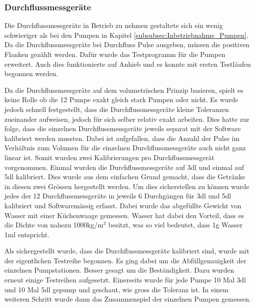\subsubsection{Durchflussmessgeräte}
\label{subsubsec:Inbetriebnahme_Durchflussmessgeräte}

Die Durchflussmessgeräte in Betrieb zu nehmen gestaltete sich ein wenig schwieriger als bei den Pumpen in Kapitel \ref{subsubsec:Inbetriebnahme_Pumpen}. Da die Durchflussmessgeräte bei Durchfluss Pulse ausgeben, müssen die positiven Flanken gezählt werden. Dafür wurde das Testprogramm für die Pumpen erweitert. Auch dies funktionierte auf Anhieb und es konnte mit ersten Testläufen begonnen werden. 

Da die Durchflussmessgeräte auf dem volumetrischen Prinzip basieren, spielt es keine Rolle ob die 12 Pumpe exakt gleich stark Pumpen oder nicht. Es wurde jedoch schnell festgestellt, dass die Durchflussmessgeräte kleine Toleranzen zueinander aufweisen, jedoch für sich selber relativ exakt arbeiten. Dies hatte zur folge, dass die einzelnen Durchflussmessgeräte jeweils separat mit der Software kalibriert werden mussten. Dabei ist aufgefallen, dass die Anzahl der Pulse im Verhältnis zum Volumen für die einzelnen Durchflussmessgeräte auch nicht ganz linear ist. Somit wurden zwei Kalibrierungen pro Durchflussmessgerät vorgenommen. Einmal wurden die Durchflussmessgeräte auf 3dl und einmal auf 5dl kalibriert. Dies wurde aus dem einfachen Grund gemacht, dass die Getränke in diesen zwei Grössen hergestellt werden. Um dies sicherstellen zu können wurde jedes der 12 Durchflussmessgeräte in jeweils 6 Durchgängen für 3dl und 5dl kalibriert und Softwaremässig erfasst. Dabei wurde das abgefüllte Gewicht von Wasser mit einer Küchenwaage gemessen. Wasser hat dabei den Vorteil, dass es die Dichte von nahezu 1000kg/m$^3$ besitzt, was so viel bedeutet, dass 1g Wasser 1ml entspricht. \cite{wagner_iapws_2002}


Als sichergestellt wurde, dass die Durchflussmessgeräte kalibriert sind, wurde mit der eigentlichen Testreihe begonnen. Es ging dabei um die Abfüllgenauigkeit der einzelnen Pumpstationen. Besser gesagt um die Beständigkeit. Dazu wurden erneut einige Testreihen aufgesetzt. Einerseits wurde für jede Pumpe 10 Mal 3dl und 10 Mal 5dl gepump und geschaut, wie gross die Toleranz ist. In einem weiteren Schritt wurde dann das Zusammenspiel der einzelnen Pumpen gemessen. 


